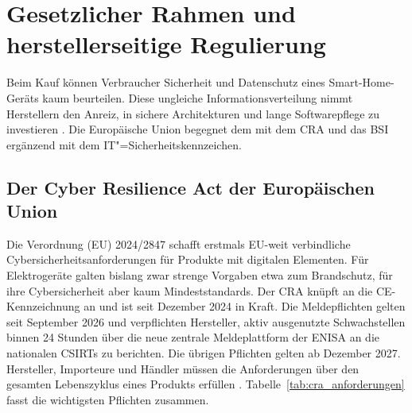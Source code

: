 \section{Gesetzlicher Rahmen und herstellerseitige Regulierung}
Beim Kauf können Verbraucher Sicherheit und Datenschutz eines
Smart-Home-Geräts kaum beurteilen. Diese ungleiche Informationsverteilung nimmt
Herstellern den Anreiz, in sichere Architekturen und lange Softwarepflege zu
investieren \cite{noauthor_cyber_nodate,noauthor_regulation_2024}. Die Europäische Union begegnet dem mit dem
\gls{CRA} und das \gls{BSI} ergänzend mit dem
IT"=Sicherheitskennzeichen.

\subsection{Der Cyber Resilience Act der Europäischen Union}
Die Verordnung (EU) 2024/2847 schafft erstmals EU-weit verbindliche
Cybersicherheitsanforderungen für Produkte mit digitalen Elementen. 
Für Elektrogeräte galten bislang zwar strenge Vorgaben etwa zum
Brandschutz, für ihre Cybersicherheit aber kaum Mindeststandards. Der \gls{CRA}
knüpft an die CE-Kennzeichnung an und ist seit Dezember 2024 in Kraft. Die
Meldepflichten gelten seit September 2026 und verpflichten Hersteller, 
aktiv ausgenutzte Schwachstellen binnen 24 Stunden über die neue zentrale Meldeplattform der ENISA an die nationalen CSIRTs zu berichten.
Die übrigen Pflichten gelten ab Dezember 2027.
Hersteller, Importeure und Händler müssen die Anforderungen über den gesamten Lebenszyklus eines Produkts erfüllen \cite{noauthor_regulation_2024}.
Tabelle~\ref{tab:cra_anforderungen} fasst die wichtigsten Pflichten zusammen.

